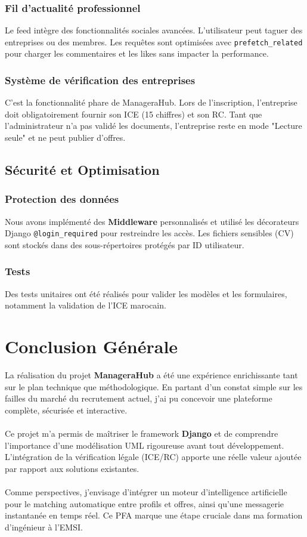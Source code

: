 \documentclass[12pt,a4paper]{report}
\begin{document}
\subsection{Fil d'actualité professionnel}
Le feed intègre des fonctionnalités sociales avancées. L'utilisateur peut taguer des entreprises ou des membres. Les requêtes sont optimisées avec \texttt{prefetch\_related} pour charger les commentaires et les likes sans impacter la performance.
\subsection{Système de vérification des entreprises}
C'est la fonctionnalité phare de ManageraHub. Lors de l'inscription, l'entreprise doit obligatoirement fournir son ICE (15 chiffres) et son RC. Tant que l'administrateur n'a pas validé les documents, l'entreprise reste en mode "Lecture seule" et ne peut publier d'offres.

\section{Sécurité et Optimisation}
\subsection{Protection des données}
Nous avons implémenté des \textbf{Middleware} personnalisés et utilisé les décorateurs Django \texttt{@login\_required} pour restreindre les accès. Les fichiers sensibles (CV) sont stockés dans des sous-répertoires protégés par ID utilisateur.
\subsection{Tests}
Des tests unitaires ont été réalisés pour valider les modèles et les formulaires, notamment la validation de l'ICE marocain.

\chapter*{Conclusion Générale}
La réalisation du projet \textbf{ManageraHub} a été une expérience enrichissante tant sur le plan technique que méthodologique. En partant d'un constat simple sur les failles du marché du recrutement actuel, j'ai pu concevoir une plateforme complète, sécurisée et interactive. \\
\\
Ce projet m'a permis de maîtriser le framework \textbf{Django} et de comprendre l'importance d'une modélisation UML rigoureuse avant tout développement. L'intégration de la vérification légale (ICE/RC) apporte une réelle valeur ajoutée par rapport aux solutions existantes. \\
\\
Comme perspectives, j'envisage d'intégrer un moteur d'intelligence artificielle pour le matching automatique entre profils et offres, ainsi qu'une messagerie instantanée en temps réel. Ce PFA marque une étape cruciale dans ma formation d'ingénieur à l'EMSI.
\end{document}
